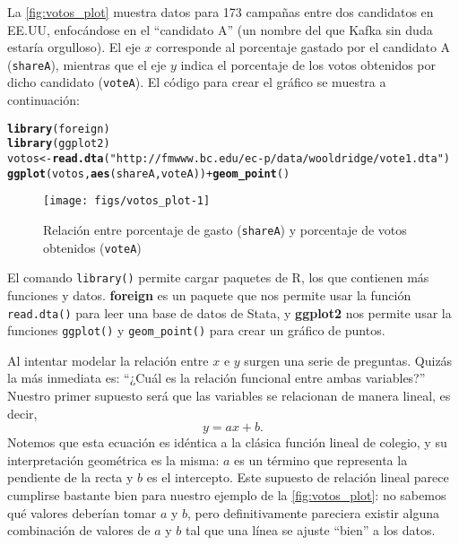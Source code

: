 \documentclass{report}\usepackage[]{graphicx}\usepackage[]{color}
\makeatletter
\newcommand{\hlstr}[1]{\textcolor[rgb]{0.192,0.494,0.8}{#1}}%
\newcommand{\hlopt}[1]{\textcolor[rgb]{0,0,0}{#1}}%
\newcommand{\hlstd}[1]{\textcolor[rgb]{0.345,0.345,0.345}{#1}}%
\newcommand{\hlkwb}[1]{\textcolor[rgb]{0.69,0.353,0.396}{#1}}%
\newcommand{\hlkwd}[1]{\textcolor[rgb]{0.737,0.353,0.396}{\textbf{#1}}}%
\newenvironment{kframe}{%
 \def\at@end@of@kframe{}%
 \ifinner\ifhmode%
  \def\at@end@of@kframe{\end{minipage}}%
  \begin{minipage}{\columnwidth}%
 \fi\fi%
 \def\FrameCommand##1{\hskip\@totalleftmargin \hskip-\fboxsep
 \colorbox{shadecolor}{##1}\hskip-\fboxsep
     \hskip-\linewidth \hskip-\@totalleftmargin \hskip\columnwidth}%
 \MakeFramed {\advance\hsize-\width
   \@totalleftmargin\z@ \linewidth\hsize
   \@setminipage}}%
 {\par\unskip\endMakeFramed%
 \at@end@of@kframe}
\newenvironment{knitrout}{}{} %
\newcommand*{\paq}[1]{\textbf{#1}\index{#1@\textbf{#1}}}
\makeatother
\begin{document}
La \autoref{fig:votos_plot} muestra datos para 173 campañas entre dos candidatos en EE.UU, enfocándose en el ``candidato A'' (un nombre del que Kafka sin duda estaría orgulloso).
El eje $x$ corresponde al porcentaje gastado por el candidato A (\verb|shareA|), mientras que el eje $y$ indica el porcentaje de los votos obtenidos por dicho candidato (\verb|voteA|).
El código para crear el gráfico se muestra a continuación:
\begin{knitrout}
\color{fgcolor}\begin{kframe}
\begin{alltt}
\hlkwd{library}\hlstd{(foreign)}
\hlkwd{library}\hlstd{(ggplot2)}
\hlstd{votos} \hlkwb{<-} \hlkwd{read.dta}\hlstd{(}\hlstr{"http://fmwww.bc.edu/ec-p/data/wooldridge/vote1.dta"}\hlstd{)}
\hlkwd{ggplot}\hlstd{(votos,} \hlkwd{aes}\hlstd{(shareA, voteA))} \hlopt{+} \hlkwd{geom_point}\hlstd{()}
\end{alltt}
\end{kframe}\begin{figure}

{\centering \texttt{[image: figs/votos\_plot-1]} 

}

\caption[Relación entre porcentaje de gasto (\texttt{shareA}) y porcentaje de votos obtenidos (\texttt{voteA})]{Relación entre porcentaje de gasto (\texttt{shareA}) y porcentaje de votos obtenidos (\texttt{voteA})}\label{fig:votos_plot}
\end{figure}


\end{knitrout}
\begin{Rbox}
El comando \verb|library()| permite cargar paquetes de R, los que contienen más funciones y datos. \paq{foreign} es un paquete que nos permite usar la función \verb|read.dta()| para leer una base de datos de Stata, y \paq{ggplot2} nos permite usar la funciones \verb|ggplot()| y \verb|geom_point()| para crear un gráfico de puntos.
\end{Rbox}

Al intentar modelar la relación entre $x$ e $y$ surgen una serie de preguntas. Quizás la más inmediata es: ``¿Cuál es la relación funcional entre ambas variables?''
Nuestro primer supuesto será que las variables se relacionan de manera lineal, es decir,
\begin{equation}
y = ax + b.
\label{eq:ec_lin}
\end{equation}
Notemos que esta ecuación es idéntica a la clásica función lineal de colegio, y su interpretación geométrica es la misma: $a$ es un término que representa la pendiente de la recta y $b$ es el intercepto.
Este supuesto de relación lineal parece cumplirse bastante bien para nuestro ejemplo de la \autoref{fig:votos_plot}: no sabemos qué valores deberían tomar $a$ y $b$, pero definitivamente pareciera existir alguna combinación de valores de $a$ y $b$ tal que una línea se ajuste ``bien'' a los datos.
\end{document}
